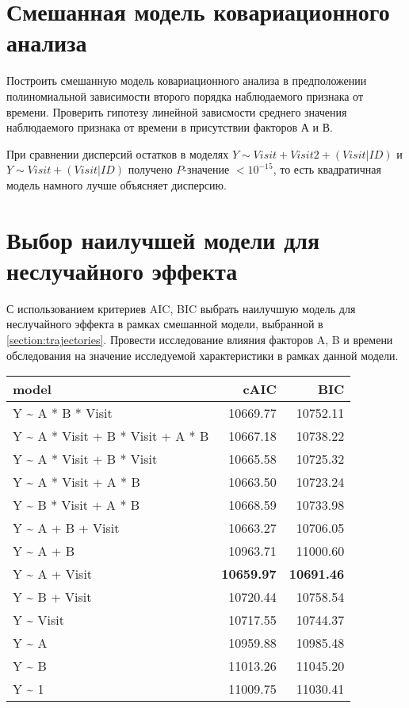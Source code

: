\documentclass[a4paper,12pt]{article}
\begin{document}
\section{ Смешанная модель ковариационного анализа }

\begin{leftbar}
Построить смешанную модель ковариационного анализа в предположении полиномиальной зависимости второго порядка наблюдаемого признака от времени.
Проверить гипотезу линейной зависмости среднего значения наблюдаемого признака от времени в присутствии факторов А и В.
\end{leftbar}

При сравнении дисперсий остатков в моделях $ Y \sim Visit + Visit2 + ( Visit | ID ) $ и $ Y \sim Visit + ( Visit | ID ) $ получено $ P $-значение $ < 10^{-15} $, то есть квадратичная модель намного лучше объясняет дисперсию.


\section{ Выбор наилучшей модели для неслучайного эффекта }

\begin{leftbar}
С использованием критериев AIC, BIC выбрать наилучшую модель для неслучайного эффекта в рамках смешанной модели, выбранной в  \ref{section:trajectories}.
Провести исследование влияния факторов A, B и времени обследования на значение исследуемой характеристики в рамках данной модели.
\end{leftbar}

\begin{table}[H]
    \centering
    \begin{tabular}{lrr}
        \hline
        model & cAIC & BIC \\
        \hline
        Y \~{} A * B * Visit & 10669.77 & 10752.11 \\
        Y \~{} A * Visit + B * Visit + A * B & 10667.18 & 10738.22 \\
        Y \~{} A * Visit + B * Visit & 10665.58 & 10725.32 \\
        Y \~{} A * Visit + A * B & 10663.50 & 10723.24 \\
        Y \~{} B * Visit + A * B & 10668.59 & 10733.98 \\
        Y \~{} A + B + Visit & 10663.27 & 10706.05 \\
        Y \~{} A + B & 10963.71 & 11000.60 \\
        Y \~{} A + Visit & \textbf{10659.97} & \textbf{10691.46} \\
        Y \~{} B + Visit & 10720.44 & 10758.54 \\
        Y \~{} Visit & 10717.55 & 10744.37 \\
        Y \~{} A & 10959.88 & 10985.48 \\
        Y \~{} B & 11013.26 & 11045.20 \\
        Y \~{} 1 & 11009.75 & 11030.41 \\
        \hline
    \end{tabular}
\end{table}
\end{document}
